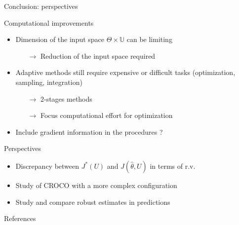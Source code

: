 \documentclass[10pt,aspectratio=169,usepdftitle=false]{beamer}
\newcommand{\Uspace}{\mathbb{U}}
\newcommand{\Kspace}{\Theta}
\newcommand{\kk}{\theta}
\newcommand{\UU}{U}
\begin{document}
\begin{frame}[label=conclusion]{Conclusion: perspectives}
  \begin{block}{Computational improvements}
    \begin{itemize}
    \item Dimension of the input space $\Kspace \times \Uspace$ can be limiting
      \begin{itemize}
      \item[$\rightarrow$] Reduction of the input space required
      \end{itemize}
    \item Adaptive methods still require expensive or difficult tasks (optimization, sampling, integration)
      \begin{itemize}
      \item[$\rightarrow$] 2-stages methods
      \item[$\rightarrow$] Focus computational effort for optimization
      \end{itemize}
    \item Include gradient information in the procedures ?
    \end{itemize}
  \end{block}

  \begin{block}{Perspectives}
    \begin{itemize}
    \item Discrepancy between $J^*(\UU)$ and $J(\hat{\kk},\UU)$ in terms of r.v.\
    \item Study of CROCO with a more complex configuration
    \item Study and compare robust estimates in predictions
  \end{itemize}
  \end{block}
\end{frame}
\appendix

\begin{frame}[allowframebreaks]{References}
  \renewcommand{\bibsection}{}

  
\end{frame}
\end{document}
